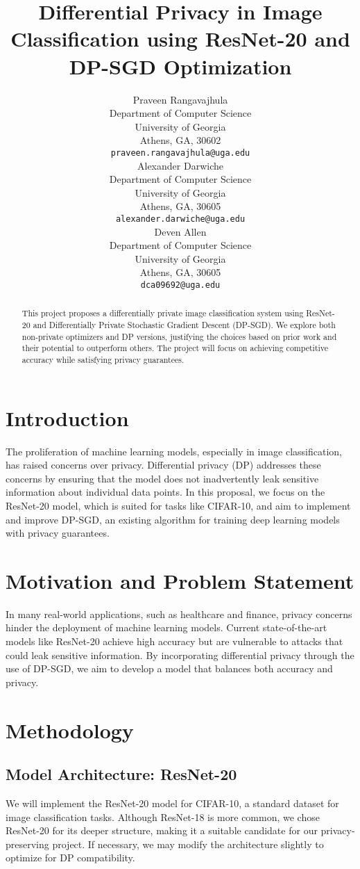\documentclass{article}
\title{Differential Privacy in Image Classification using ResNet-20 and DP-SGD Optimization}
\author{
    Praveen Rangavajhula\\
    Department of Computer Science\\
    University of Georgia\\
    Athens, GA, 30602\\
    \texttt{praveen.rangavajhula@uga.edu} \\
    \And
    Alexander Darwiche\\
    Department of Computer Science\\
    University of Georgia\\
    Athens, GA, 30605 \\
    \texttt{alexander.darwiche@uga.edu} \\
    \And
    Deven Allen\\
    Department of Computer Science\\
    University of Georgia\\
    Athens, GA, 30605 \\
    \texttt{dca09692@uga.edu} \\
}
\begin{document}
    \maketitle

    \begin{abstract}
        This project proposes a differentially private image classification system using ResNet-20 and Differentially
        Private Stochastic Gradient Descent (DP-SGD). We explore both non-private optimizers and DP versions,
        justifying the choices based on prior work and their potential to outperform others.
        The project will focus on achieving competitive accuracy while satisfying privacy guarantees.
    \end{abstract}


    \section{Introduction}\label{sec:introduction}
    The proliferation of machine learning models, especially in image classification, has raised concerns over privacy.
    Differential privacy (DP) addresses these concerns by ensuring that the model does not inadvertently leak sensitive
    information about individual data points.
    In this proposal, we focus on the ResNet-20 model, which is suited for tasks like CIFAR-10, and aim to implement
    and improve DP-SGD, an existing algorithm for training deep learning models with privacy guarantees.


    \section{Motivation and Problem Statement}\label{sec:motivation-and-problem-statement}
    In many real-world applications, such as healthcare and finance, privacy concerns hinder the deployment of machine
    learning models.
    Current state-of-the-art models like ResNet-20 achieve high accuracy but are vulnerable to attacks
    that could leak sensitive information.
    By incorporating differential privacy through the use of DP-SGD, we aim to
    develop a model that balances both accuracy and privacy.


    \section{Methodology}\label{sec:methodology}

    \subsection{Model Architecture: ResNet-20}\label{subsec:model-architecture:-resnet-20}
    We will implement the ResNet-20 model for CIFAR-10, a standard dataset for image classification tasks.
    Although ResNet-18 is more common, we chose ResNet-20 for its deeper structure, making it a suitable candidate
    for our privacy-preserving project.
    If necessary, we may modify the architecture slightly to optimize for DP compatibility.
\end{document}
